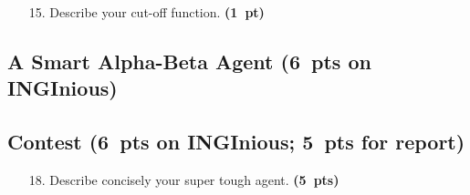 \documentclass[11pt,a4paper]{report}
\begin{document}
\begin{answers}[10cm]
\end{answers}






\begin{enumerate}
\item[15.] Describe your cut-off function. \textbf{(1~pt)}
\end{enumerate}

\begin{answers}[9cm]
\end{answers}





\clearpage
\subsection{A Smart Alpha-Beta Agent (6~pts on INGInious)}
\medskip

\subsection{Contest (6~pts on INGInious; 5~pts for report)}


\begin{enumerate}
\item[18.] Describe concisely your super tough agent. \textbf{(5~pts)}
\end{enumerate}

\begin{answers}[20cm]
\end{answers}

\begin{answers}[23cm]
\end{answers}
\end{document}
